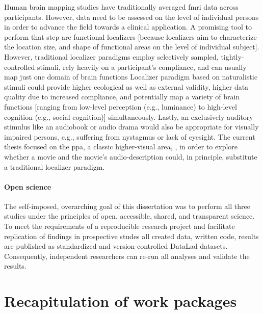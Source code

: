 
Human brain mapping studies have traditionally averaged \ac{fmri} data across
participants.
%
However, data need to be assessed on the level of individual persons in order to
advance the field towards a clinical application.
A promising tool to perform that step are functional localizers [because
localizers aim to characterize the location size, and shape of functional areas
on the level of individual subject].
However, traditional localizer paradigms employ selectively sampled,
tightly-controlled stimuli, rely heavily on a participant's compliance, and can
usually map just one domain of brain functions
Localizer paradigm based on naturalistic stimuli could provide higher ecological
as well as external validity, higher data quality due to increased compliance,
and potentially map a variety of brain functions [ranging from low-level
perception (e.g., luminance) to high-level cognition (e.g., social cognition)]
simultaneously.
Lastly, an exclusively auditory stimulus like an audiobook or audio drama would
also be appropriate for visually impaired persons, e.g., suffering from
nystagmus or lack of eyesight.
The current thesis focused on the \ac{ppa}, a classic higher-visual area,
\citep{epstein1998ppa}, in order to explore whether a movie and the movie's
audio-description could, in principle, substitute a traditional localizer
paradigm.

\paragraph{Open science}
The self-imposed, overarching goal of this dissertation was to perform all three
studies under the principles of open, accessible, shared, and transparent
science.
To meet the requirements of a reproducible research project and facilitate
replication of findings in prospective studes all created data, written code,
results are published as standardized and version-controlled DataLad
\citep[\href{www.datalad.org}{datalad.org};][]{halchenko2021datalad} datasets.
Consequently, independent researchers can re-run all analyses and validate the
results.


\section{Recapitulation of work packages}

